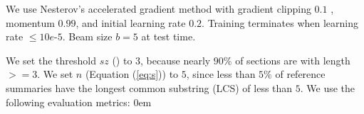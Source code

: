 We use Nesterov's
accelerated gradient method \cite{SutskeverMDH13} with gradient clipping $0.1$ \cite{PascanuMB13}, momentum $0.99$,
and initial learning rate $0.2$.
Training terminates when learning rate $\le 10e$-$5$.
Beam size $b=5$ at test time.

We set the threshold $sz$ () to $3$, 
because nearly $90\%$ 
of sections are with length$>=$3.
We set $n$ (Equation (\ref{eq:s})) to $5$,
since less than $5\%$ of reference summaries have
the longest common substring (LCS) of less than $5$.
We use the following evaluation metrics:
\itemsep0em

